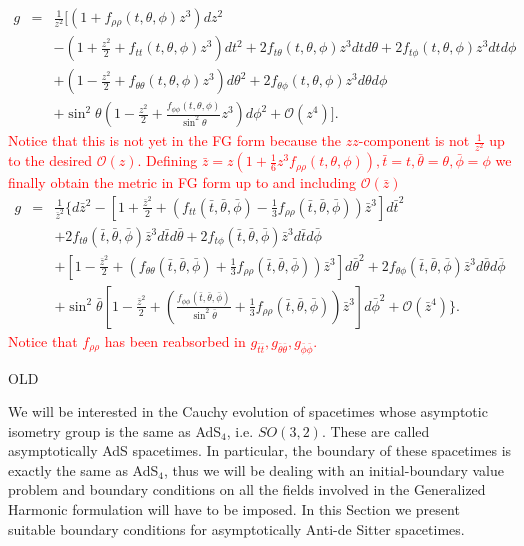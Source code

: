 \documentclass[a4paper,11pt]{article}
\numberwithin{equation}{section}
\begin{document}
\begin{eqnarray}
g&=&\frac{1}{z^2}\biggl[ 
\left(1+f_{\rho\rho}(t,\theta,\phi)z^3\right)dz^2 \nonumber \\
&&- \left(1+\frac{z^2}{2}+f_{tt}(t,\theta,\phi)z^3\right)dt^2+ 2 f_{t\theta}(t,\theta,\phi)z^3dt d\theta + 2 f_{t\phi}(t,\theta,\phi) z^3dt d\phi  \nonumber \\
&&+  \left(1-\frac{z^2}{2}+f_{\theta\theta}(t,\theta,\phi)z^3 \right)d\theta^2+ 2 f_{\theta\phi}(t,\theta,\phi) z^3d\theta d\phi \nonumber\\
&&+  \sin^2\theta \left(1-\frac{z^2}{2}+\frac{f_{\phi\phi}(t,\theta,\phi)}{\sin^2\theta} z^3 \right)d\phi^2+\mathcal{O}(z^4)
\biggr].
\end{eqnarray}
\textcolor{red}{Notice that this is not yet in the FG form because the $zz$-component is not $\frac{1}{z^2}$ up to the desired $\mathcal{O}(z)$. Defining $\bar{z}=z\left(1+\frac{1}{6}z^3f_{\rho\rho}(t,\theta,\phi)\right),\bar{t}=t,\bar{\theta}=\theta,\bar{\phi}=\phi$ we finally obtain the metric in FG form up to and including $\mathcal{O}(\bar{z})$}
\begin{eqnarray}
g&=&\frac{1}{\bar{z}^2}\biggl\{ d\bar{z}^2- \left[1+\frac{\bar{z}^2}{2}+\left(f_{tt}(\bar{t},\bar{\theta},\bar{\phi})-\frac{1}{3}f_{\rho\rho}(\bar{t},\bar{\theta},\bar{\phi})\right)\bar{z}^3 \right]d\bar{t}^2 \nonumber \\
&&+ 2 f_{t\theta}(\bar{t},\bar{\theta},\bar{\phi})\bar{z}^3d\bar{t} d\bar{\theta} + 2 f_{t\phi}(\bar{t},\bar{\theta},\bar{\phi}) \bar{z}^3d\bar{t} d\bar{\phi}  \nonumber \\
&&+  \left[1-\frac{\bar{z}^2}{2}+\left(f_{\theta\theta}(\bar{t},\bar{\theta},\bar{\phi})+\frac{1}{3}f_{\rho\rho}(\bar{t},\bar{\theta},\bar{\phi})\right)\bar{z}^3 \right]d\bar{\theta}^2+ 2 f_{\theta\phi}(\bar{t},\bar{\theta},\bar{\phi}) \bar{z}^3d\bar{\theta} d\bar{\phi} \nonumber\\
&&+   \sin^2\bar{\theta} \left[1-\frac{\bar{z}^2}{2}+\left(\frac{f_{\phi\phi}(\bar{t},\bar{\theta},\bar{\phi})}{ \sin^2\bar{\theta}}+\frac{1}{3}f_{\rho\rho}(\bar{t},\bar{\theta},\bar{\phi})\right)\bar{z}^3\right]d\bar{\phi}^2+\mathcal{O}(\bar{z}^4)
\biggr\}.
\end{eqnarray}
\textcolor{red}{Notice that $f_{\rho\rho}$ has been reabsorbed in $g_{\bar{t}\bar{t}},g_{\bar{\theta}\bar{\theta}},g_{\bar{\phi}\bar{\phi}}$.}


\iffalse
OLD

We will be interested in the Cauchy evolution of spacetimes whose asymptotic isometry group is the same as AdS$_4$, i.e. $SO(3,2)$. These are called asymptotically AdS spacetimes. In particular, the boundary of these spacetimes is exactly the same as AdS$_4$, thus we will be dealing with an initial-boundary value problem and boundary conditions on all the fields involved in the Generalized Harmonic formulation will have to be imposed.
In this Section we present suitable boundary conditions for asymptotically Anti-de Sitter spacetimes.
\end{document}
